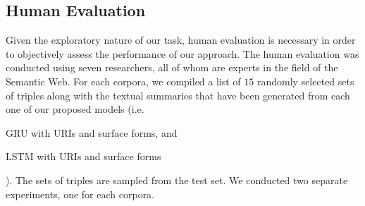 \documentclass[preprint,5p]{elsarticle}
\begin{document}
\subsection{Human Evaluation}

Given the exploratory nature of our task, human evaluation is necessary in order to objectively assess the performance of our approach. The human evaluation was conducted using seven researchers, all of whom are experts in the field of the Semantic Web. For each corpora, we compiled a list of $15$ randomly selected sets of triples along with the textual summaries that have been generated from each one of our proposed models (i.e.\begin{inparaenum}[(i)]\item GRU with URIs and surface forms, and \item LSTM with URIs and surface forms\end{inparaenum}). The sets of triples are sampled from the test set. We conducted two separate experiments, one for each corpora.
\end{document}
